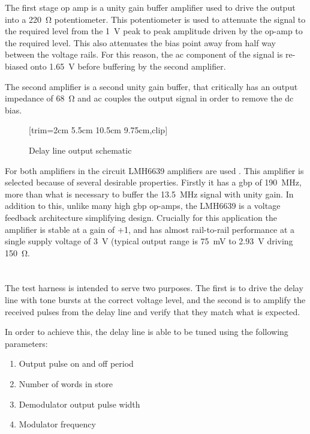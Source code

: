 The first stage op amp is a unity gain buffer amplifier used to drive the output into a \SI{220}{\ohm} potentiometer. This potentiometer is used to attenuate the signal to the required level from the \SI{1}{\volt} peak to peak amplitude driven by the op-amp to the required level. This also attenuates the bias point away from half way between the voltage rails. For this reason, the \gls{ac} component of the signal is re-biased onto \SI{1.65}{\volt} before buffering by the second amplifier.

The second amplifier is a second unity gain buffer, that critically has an output impedance of \SI{68}{\ohm} and \gls{ac} couples the output signal in order to remove the \gls{dc} bias.

\begin{figure}[ht]
	\centering
		[trim={2cm 5.5cm 10.5cm 9.75cm},clip] %
	\caption{Delay line output schematic}
	\label{fig:delay-line-output-sch}
\end{figure}

For both amplifiers in the circuit LMH6639 amplifiers are used \cite{ti2013}. This amplifier is selected because of several desirable properties. Firstly it has a \gls{gbp} of \SI{190}{\mega\hertz}, more than what is necessary to buffer the \SI{13.5}{\mega\hertz} signal with unity gain. In addition to this, unlike many high \gls{gbp} op-amps, the LMH6639 is a voltage feedback architecture simplifying design. Crucially for this application the amplifier is stable at a gain of +1, and has almost rail-to-rail performance at a single supply voltage of \SI{3}{\volt} (typical output range is \SI{75}{\milli\volt} to \SI{2.93}{\volt} driving \SI{150}{\ohm}.


\chapter{} \label{sec:test-harness-design}

The test harness is intended to serve two purposes. The first is to drive the delay line with tone bursts at the correct voltage level, and the second is to amplify the received pulses from the delay line and verify that they match what is expected.

In order to achieve this, the delay line is able to be tuned using the following parameters:
\begin{enumerate}
	\item Output pulse on and off period
	\item Number of words in store
	\item Demodulator output pulse width
	\item Modulator frequency
\end{enumerate}

